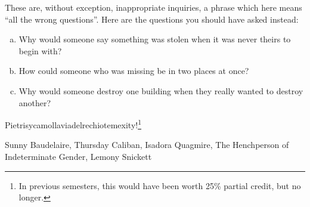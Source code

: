 \documentclass[11pt]{article}
\begin{document}



\begin{solution}
These are, without exception, inappropriate inquiries, a phrase which here means “all the wrong questions”.  Here are the questions you should have asked instead:
\begin{enumerate}[(a)]
\item Why would someone say something was stolen when it was never theirs to begin with?
\item How could someone who was missing be in two places at once?
\item Why would someone destroy one building when they really wanted to destroy another?
\end{enumerate}
\end{solution}

\begin{solution}
Pietrisycamollaviadelrechiotemexity!\footnote{In previous semesters, this would have been worth 25\% partial credit, but no longer.}
\end{solution}

\begin{Sources}
Sunny Baudelaire, Thursday Caliban, Isadora Quagmire, The Henchperson of Indeterminate Gender, Lemony Snickett
\end{Sources}




\newtheorem{lemma}{Lemma}
\end{document}
